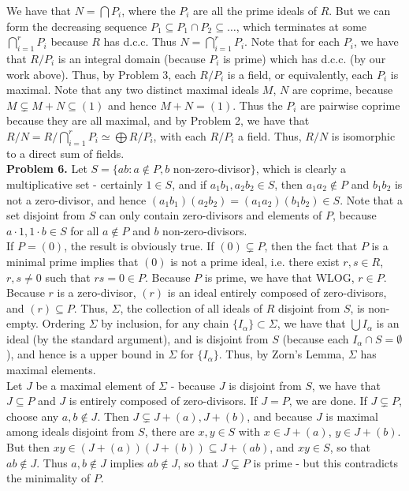 \documentclass[11pt]{article}
\newcommand{\num}[1]{\noindent \textbf{#1}}
\theoremstyle{definition}
\begin{document}
\noindent We have that $N=\bigcap P_i$, where the $P_i$ are all the prime
ideals of $R$. But we can form the decreasing sequence $P_1\subseteq P_1\cap
P_2 \subseteq \ldots$, which terminates at some $\bigcap_{i=1}^r P_i$ because
$R$ has d.c.c. Thus $N=\bigcap_{i=1}^r P_i$. Note that for each $P_i$, we
have that $R/P_i$ is an integral domain (because $P_i$ is prime) which has
d.c.c. (by our work above). Thus, by Problem 3, each $R/P_i$ is a field,
or equivalently, each $P_i$ is maximal. Note that any two distinct maximal
ideals $M$, $N$ are coprime, because $M\subsetneq M+N\subseteq (1)$ and hence
$M+N=(1)$. Thus the $P_i$ are pairwise coprime because they are all maximal,
and by Problem 2, we have that $R/N=R/\bigcap_{i=1}^r P_i\simeq\bigoplus
R/P_i$, with each $R/P_i$ a field. Thus, $R/N$ is isomorphic to a direct
sum of fields. \\

\num{Problem 6.} Let $S=\{ab:a\notin P, b$ non-zero-divisor$\}$, which is
clearly a multiplicative set - certainly $1\in S$, and if $a_1b_1,a_2b_2\in
S$, then $a_1a_2\notin P$ and $b_1b_2$ is not a zero-divisor, and hence
$(a_1b_1)(a_2b_2)=(a_1a_2)(b_1b_2)\in S$. Note that a set disjoint from $S$
can only contain zero-divisors and elements of $P$, because $a\cdot1,1\cdot
b\in S$ for all $a\notin P$ and $b$ non-zero-divisors.\\

\noindent If $P=(0)$, the result is obviously true. If $(0)\subsetneq P$,
then the fact that $P$ is a minimal prime implies that $(0)$ is not a
prime ideal, i.e. there exist $r,s\in R$, $r,s\neq0$ such that $rs=0\in
P$. Because $P$ is prime, we have that WLOG, $r\in P$. Because $r$ is a
zero-divisor, $(r)$ is an ideal entirely composed of zero-divisors, and
$(r)\subseteq P$.  Thus, $\Sigma$, the collection of all ideals of $R$
disjoint from $S$, is non-empty. Ordering $\Sigma$ by inclusion, for any
chain $\{I_\alpha\}\subset \Sigma$, we have that $\bigcup I_\alpha$ is an
ideal (by the standard argument), and is disjoint from $S$ (because each
$I_\alpha\cap S=\emptyset$), and hence is a upper bound in $\Sigma$ for
$\{I_\alpha\}$. Thus, by Zorn's Lemma, $\Sigma$ has maximal elements.\\

\noindent Let $J$ be a maximal element of $\Sigma$ - because $J$ is
disjoint from $S$, we have that $J\subseteq P$ and $J$ is entirely composed
of zero-divisors. If $J=P$, we are done. If $J\subsetneq P$, choose any
$a,b\notin J$. Then $J\subsetneq J+(a),J+(b)$, and because $J$ is maximal
among ideals disjoint from $S$, there are $x,y\in S$ with $x\in J+(a)$,
$y\in J+(b)$. But then $xy\in (J+(a))(J+(b))\subseteq J+(ab)$, and $xy\in
S$, so that $ab\notin J$. Thus $a,b\notin J$ implies $ab\notin J$, so that
$J\subsetneq P$ is prime - but this contradicts the minimality of $P$.\\
\end{document}
